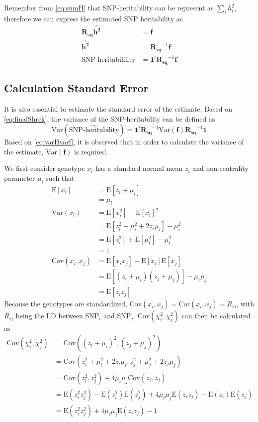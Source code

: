 \documentclass[12pt]{scrbook}
\begin{document}
Remember from \cref{eq:sumH} that \gls{SNP}-heritability can be represent as $\sum_ih_i^2$, therefore we can express the estimated \gls{SNP} heritability as 
\begin{align}
\boldsymbol{R_{sq}\hat{h^2}}&=\boldsymbol{f}\nonumber\\
\boldsymbol{\hat{h^2}}&=\boldsymbol{R_{sq}}^{-1}\boldsymbol{f}\nonumber\\
\text{SNP-heritabilility}&=\boldsymbol{1}^t\boldsymbol{R_{sq}}^{-1}\boldsymbol{f}
\label{eq:finalShrek}
\end{align}

\subsection{Calculation Standard Error}
It is also essential to estimate the standard error of the estimate.
Based on \cref{eq:finalShrek}, the variance of the \gls{SNP}-heritability can be defined as
\begin{equation}
\mathrm{Var}(\hat{\text{SNP-heritability}})=\boldsymbol{1}^t\boldsymbol{R_{sq}}^{-1}\mathrm{Var}(\boldsymbol{f})\boldsymbol{R_{sq}}^{-1}\boldsymbol{1}
\label{eq:varHvarf}
\end{equation}
Based on \cref{eq:varHvarf}, it is observed that in order to calculate the variance of the estimate, $\mathrm{Var}(\boldsymbol{f})$ is required.

We first consider genotype $x_i$ has a standard normal mean $z_i$ and non-centrality parameter $\mu_i$ such that
\begin{align}
\mathrm{E}[x_i]&=\mathrm{E}[z_i+\mu_i] \nonumber\\
&=\mu_i\\
\mathrm{Var}(x_i)&=\mathrm{E}[x_i^2]-\mathrm{E}[x_i]^2\nonumber\\
&=\mathrm{E}[z_i^2+\mu_i^2+2z_i\mu_i]-\mu_i^2\nonumber\\
&=\mathrm{E}[z_i^2]+\mathrm{E}[\mu_i^2]-\mu_i^2\nonumber\\
&=1\\
\mathrm{Cov}(x_i,x_j)&=\mathrm{E}[x_ix_j]-\mathrm{E}[x_i]\mathrm{E}[x_j]\nonumber\\
&=\mathrm{E}[(z_i+\mu_i)(z_j+\mu_j)]-\mu_i\mu_j\nonumber\\
&=\mathrm{E}[z_iz_j]
\end{align}
Because the genotypes are standardized, $\mathrm{Cov}(x_i,x_j)=\mathrm{Cor}(x_i,x_j)=R_{ij}$, with $R_{ij}$ being the \gls{LD} between \gls{SNP}$_i$ and \gls{SNP}$_j$.
$\mathrm{Cov}(\chi_i^2, \chi_j^2)$ can then be calculated as 
\begin{align}
\mathrm{Cov}(\chi_i^2, \chi_j^2)&=\mathrm{Cov}\left((z_i+\mu_i)^2,(z_j+\mu_j)^2\right)\nonumber\\
&=\mathrm{Cov}\left(z_i^2+\mu_i^2+2z_i\mu_i, z_j^2+\mu_j^2+2z_j\mu_j \right)\nonumber\\
&=\mathrm{Cov}(z_i^2,z_j^2)+4\mu_i\mu_j\mathrm{Cov}(z_i,z_j)\nonumber\\
&=\mathrm{E}(z_i^2z_j^2)-\mathrm{E}(z_i^2)\mathrm{E}(z_j^2)+4\mu_i\mu_j\mathrm{E}(z_iz_j)-\mathrm{E}(z_i)\mathrm{E}(z_j)\nonumber\\
&=\mathrm{E}(z_i^2z_j^2)+4\mu_i\mu_j\mathrm{E}(z_iz_j)-1
\end{align}
\end{document}

